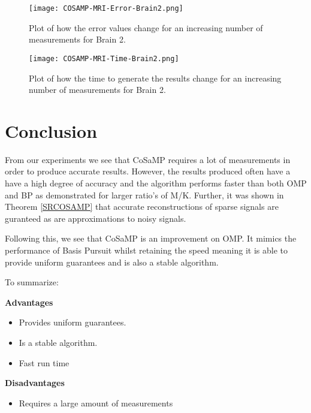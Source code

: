 \documentclass[titlepage,oneside, 12pt]{book}
\theoremstyle{break}
\begin{document}
\begin{figure}[H]
\centering
\centerline{\texttt{[image: COSAMP-MRI-Error-Brain2.png]}}
\caption{Plot of how the error values change for an increasing number of measurements for Brain 2.}
\label{fig:COSAMP-MRI-Error-Brain2}
\end{figure}


\begin{figure}[H]
\centering
\centerline{\texttt{[image: COSAMP-MRI-Time-Brain2.png]}}
\caption{Plot of how the time to generate the results change for an increasing number of measurements for Brain 2.}
\label{fig:COSAMP-MRI-Time-Brain2}
\end{figure}

\clearpage

\section{Conclusion}

From our experiments we see that CoSaMP requires a lot of measurements in order to produce accurate results.   However, the results produced often have a have a high degree of accuracy and the algorithm performs faster than both OMP and BP as demonstrated for larger ratio's of M/K. Further, it was shown in Theorem \ref{SRCOSAMP} that accurate reconstructions of sparse signals are guranteed as are approximations to noisy signals\cite{CoSaMP}.

Following this, we see that CoSaMP is an improvement on OMP. It mimics the performance of Basis Pursuit whilst retaining the speed meaning it is able to provide uniform guarantees and is also a stable algorithm. 

\begin{flushleft}
To summarize:
\end{flushleft}

\textbf{Advantages}
\begin{itemize}
\item Provides uniform guarantees.
\item Is a stable algorithm.
\item Fast run time

\end{itemize}

\textbf{Disadvantages}
\begin{itemize}
\item Requires a large amount of measurements
\end{itemize}
\end{document}
